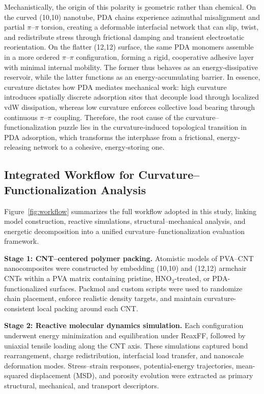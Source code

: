 \documentclass[journal=jacsat,manuscript=article]{achemso}
\begin{document}
{Mechanistically, the origin of this polarity is geometric rather than chemical. On the curved (10,10) nanotube, PDA chains experience azimuthal misalignment and partial $\pi$–$\pi$ torsion, creating a deformable interfacial network that can slip, twist, and redistribute stress through frictional damping and transient electrostatic reorientation. On the flatter (12,12) surface, the same PDA monomers assemble in a more ordered $\pi$–$\pi$ configuration, forming a rigid, cooperative adhesive layer with minimal internal mobility. The former thus behaves as an energy‐dissipative reservoir, while the latter functions as an energy‐accumulating barrier. In essence, curvature dictates how PDA mediates mechanical work: high curvature introduces spatially discrete adsorption sites that decouple load through localized vdW dissipation, whereas low curvature enforces collective load bearing through continuous $\pi$–$\pi$ coupling. Therefore, the root cause of the curvature–functionalization puzzle lies in the curvature‐induced topological transition in PDA adsorption, which transforms the interphase from a frictional, energy‐releasing network to a cohesive, energy‐storing one.


\subsection{Integrated Workflow for Curvature–Functionalization Analysis}

Figure~\ref{fig:workflow} summarizes the full workflow adopted in this study, linking model construction, reactive simulations, structural–mechanical analysis, and energetic decomposition into a unified curvature–functionalization evaluation framework.

\medskip
\textbf{Stage 1: CNT–centered polymer packing.}
Atomistic models of PVA–CNT nanocomposites were constructed by embedding (10,10) and (12,12) armchair CNTs within a PVA matrix containing pristine, HNO$_3$-treated, or PDA-functionalized surfaces. Packmol and custom scripts were used to randomize chain placement, enforce realistic density targets, and maintain curvature-consistent local packing around each CNT.

\medskip
\textbf{Stage 2: Reactive molecular dynamics simulation.}
Each configuration underwent energy minimization and equilibration under ReaxFF, followed by uniaxial tensile loading along the CNT axis. These simulations captured bond rearrangement, charge redistribution, interfacial load transfer, and nanoscale deformation modes. Stress–strain responses, potential-energy trajectories, mean-squared displacement (MSD), and porosity evolution were extracted as primary structural, mechanical, and transport descriptors.

}
\end{document}
